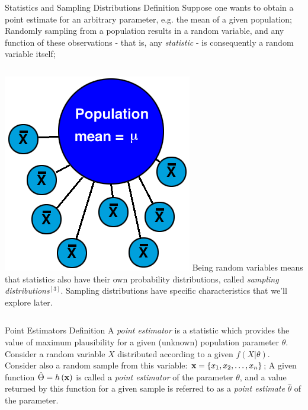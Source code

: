 \documentclass[t]{beamer}
\begin{document}

\begin{ftst}
{Statistics and Sampling Distributions}
{Definition}
Suppose one wants to obtain a point estimate for an arbitrary parameter, e.g. the mean of a given population;
\vone
Randomly sampling from a population results in a random variable, and any function of these observations - that is, any \textit{statistic} - is consequently a random variable itself;
\vhalf
\begin{columns}
\includegraphics[width=\textwidth]{../figs/sam.png}
\vhalf
Being random variables means that statistics also have their own probability distributions, called \textit{sampling distributions}$^{[3]}$. Sampling distributions have specific characteristics that we'll explore later.
\end{columns}
\end{ftst}


\begin{ftst}
{Point Estimators}
{Definition}
A \textit{point estimator} is a statistic which provides the value of maximum plausibility for a given (unknown) population parameter $\theta$.
\vone
Consider a random variable $X$ distributed according to a given $f(X|\theta)$.
\vone
Consider also a random sample from this variable: $\mathbf{x}=\{x_1,x_2,\ldots,x_n\}$;
\vone
A given function $\hat{\Theta}=h\left(\mathbf{x}\right)$ is called a \textit{point estimator} of the parameter $\theta$, and a value returned by this function for a given sample is referred to as a \textit{point estimate} $\hat{\theta}$ of the parameter.
\end{ftst}
\end{document}
